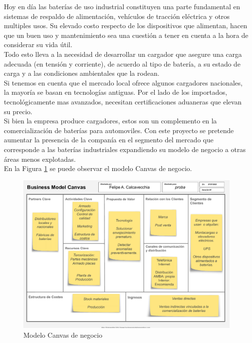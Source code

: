 \documentclass[11pt]{charter}
\begin{document}
Hoy en día las baterías de uso industrial constituyen una parte fundamental en sistemas de respaldo de alimentación, vehículos de tracción eléctrica y otros multiples usos. Su elevado costo respecto de los  dispositivos que alimentan, hacen que un buen uso y mantenimiento sea una cuestión a tener en cuenta a la hora de considerar su vida útil.
\\[3pt]
Todo esto lleva a la necesidad de desarrollar un cargador que asegure una carga adecuada (en tensión y corriente), de acuerdo al tipo de batería, a su estado de carga y a las condiciones ambientales que la rodean.
\\[3pt]
Si tenemos en cuenta que el mercado local ofrece algunos cargadores nacionales, la mayoría se basan en tecnologías antiguas. Por el lado de los importados, tecnológicamente mas avanzados, necesitan certificaciones aduaneras que elevan su precio.
\\[3pt]
Si bien la empresa produce cargadores, estos son un complemento en la comercialización de baterías para automoviles. Con este proyecto se pretende aumentar la presencia de la companía en el segmento del mercado que corresponde a las baterías industriales expandiendo su modelo de negocio a otras áreas menos explotadas.\\ 
En la Figura \ref{fig:modeloCanvas} se puede observar el modelo Canvas de negocio.

\begin{figure}[h]
\centering 
\includegraphics[width=.9\textwidth]{./Figuras/Canvas1.pdf}
\caption{Modelo Canvas de negocio}
\label{fig:modeloCanvas}
\end{figure}
\end{document}
